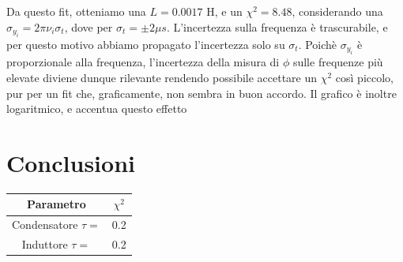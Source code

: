 Da questo fit, otteniamo una $L=0.0017$ H, e un $\chi^2 = 8.48 $, considerando una $\sigma_{y_i} = 2 \pi \nu_i \sigma_{t}$, dove  per $\sigma_t = \pm 2 \mu s$. L'incertezza sulla frequenza è trascurabile, e per questo motivo abbiamo propagato l'incertezza solo su $\sigma_t$. Poichè $\sigma_{y_i}$ è proporzionale alla frequenza, l'incertezza della misura di $\phi$ sulle frequenze più elevate diviene dunque rilevante rendendo possibile accettare un $\chi^2$ così piccolo, pur per un fit che, graficamente, non sembra in buon accordo. Il grafico è inoltre logaritmico, e accentua questo effetto
 

\section{Conclusioni}


\begin{center}
\begin{tabular}{*{2}{c}}
Parametro & $\chi^2$ \\
\midrule
Condensatore $\tau =$ & 0.2 \\
Induttore $\tau =$ & 0.2 \\

\end{tabular}
\end{center}

